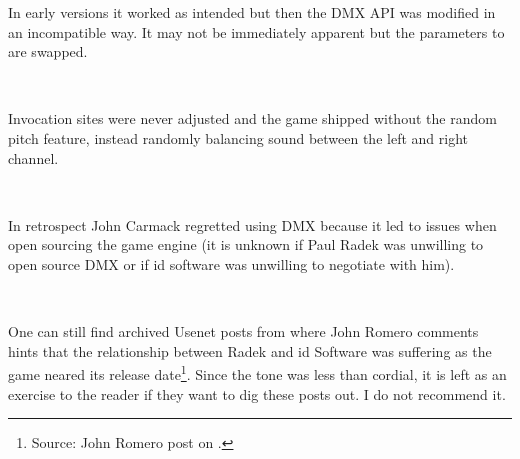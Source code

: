 In early versions it worked as intended but then the DMX API was modified in an incompatible way. It may not be immediately apparent but the parameters to  are swapped.\\
\par
{}\\
\par
 Invocation sites were never adjusted and the game shipped without the random pitch feature, instead randomly balancing sound between the left and right channel.\\
\par
{}\\
\par
In retrospect John Carmack regretted using DMX because it led to issues when open sourcing the game engine (it is unknown if Paul Radek was unwilling to open source DMX or if id software was unwilling to negotiate with him).\\
\par
{}\\
\par
One can still find archived Usenet posts from  where John Romero comments hints that the relationship between Radek and id Software was suffering as the game neared its release date\footnote{Source: John Romero post on .}. Since the tone was less than cordial, it is left as an exercise to the reader if they want to dig these posts out. I do not recommend it.



